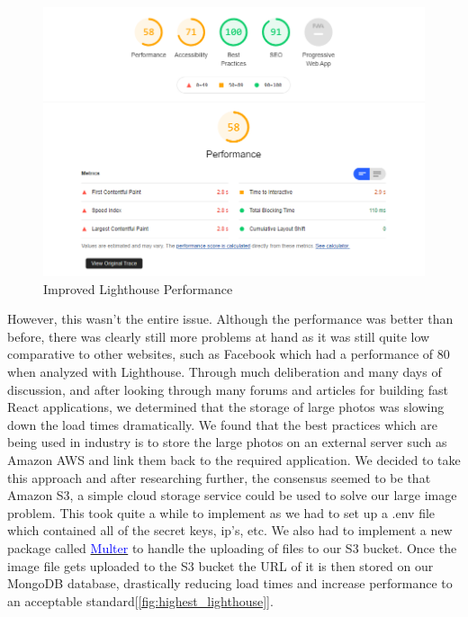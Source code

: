 \begin{figure}[H]
  \centering
  \includegraphics[scale=0.65]{img/improved_lighthouse.jpg}
  \caption{Improved Lighthouse Performance}
  \label{fig:improved_lighthouse}
\end{figure}

\newline

However, this wasn't the entire issue. Although the performance was better than before, there was clearly still more problems at hand as it was still quite low comparative to other websites, such as Facebook which had a performance of 80 when analyzed with Lighthouse. Through much deliberation and many days of discussion, and after looking through many forums and articles for building fast React applications, we determined that the storage of large photos was slowing down the load times dramatically. We found that the best practices which are being used in industry is to store the large photos on an external server such as Amazon AWS and link them back to the required application. We decided to take this approach and after researching further, the consensus seemed to be that Amazon S3, a simple cloud storage service could be used to solve our large image problem. This took quite a while to implement as we had to set up a .env file which contained all of the secret keys, ip's, etc. We also had to implement a new package called \href{https://github.com/expressjs/multer}{\textcolor{blue}{Multer}} to handle the uploading of files to our S3 bucket. Once the image file gets uploaded to the S3 bucket the URL of it is then stored on our MongoDB database, drastically reducing load times and increase performance to an acceptable standard[\ref{fig:highest_lighthouse}].

